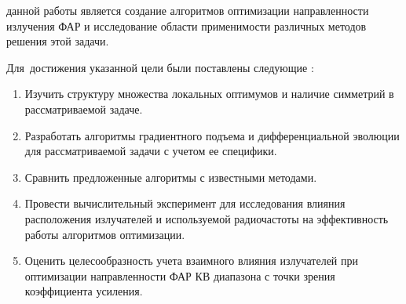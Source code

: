 
{\aim} данной работы является создание алгоритмов оптимизации направленности излучения ФАР и исследование
области применимости различных методов решения этой задачи.

Для~достижения указанной цели были поставлены следующие {\tasks}:
\begin{enumerate}[beginpenalty=10000] %
  \item Изучить структуру множества локальных оптимумов и наличие симметрий в рассматриваемой задаче.
  \item Разработать алгоритмы градиентного подъема и дифференциальной эволюции для рассматриваемой задачи с учетом ее специфики.
  \item Сравнить предложенные алгоритмы с известными методами.
  \item Провести вычислительный эксперимент для исследования влияния расположения излучателей и используемой радиочастоты на эффективность работы алгоритмов оптимизации.
  \item Оценить целесообразность учета взаимного влияния излучателей при оптимизации направленности ФАР КВ диапазона с точки зрения коэффициента усиления.
\end{enumerate}


{\novelty}


